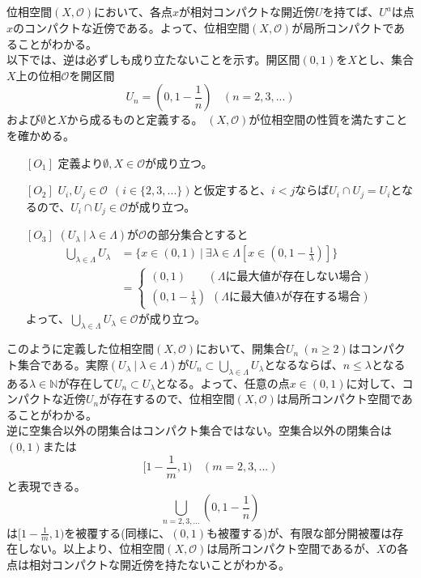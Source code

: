 \documentclass{jsarticle}
\begin{document}
\subsection{}
位相空間$(X,\mathcal{O})$において、各点$x$が相対コンパクトな開近傍$U$を持てば、$U^a$は点$x$のコンパクトな近傍である。よって、位相空間$(X,\mathcal{O})$が局所コンパクトであることがわかる。\\
以下では、逆は必ずしも成り立たないことを示す。開区間$(0,1)$を$X$とし、集合$X$上の位相$\mathcal{O}$を開区間
\[U_n=(0,1-\frac{1}{n})\ \ \ \ (n=2,3,...)\]
および$\emptyset$と$X$から成るものと定義する。
$(X,\mathcal{O})$が位相空間の性質を満たすことを確かめる。
\begin{enumerate}
\item[${[O_1]}$]
定義より$\emptyset,X\in\mathcal{O}$が成り立つ。
\item[${[O_2]}$]
$U_i,U_j\in\mathcal{O}\ \ (i\in\{2,3,...\})$と仮定すると、$i<j$ならば$U_i\cap U_j=U_i$となるので、$U_i\cap U_j\in\mathcal{O}$が成り立つ。
\item[${[O_3]}$]$(U_\lambda\ |\ \lambda\in\Lambda)$が$\mathcal{O}$の部分集合とすると
\begin{align*}
\bigcup_{\lambda\in\Lambda}U_\lambda&=\{x\in(0,1)\ |\ \exists\lambda\in\Lambda[x\in(0,1-\frac{1}{\lambda})]\}\\
&=\begin{cases}
(0,1)\ \quad\ \ \ (\Lambda に最大値が存在しない場合)\\
(0,1-\frac{1}{\lambda})\ \ (\Lambda に最大値\lambda が存在する場合)
\end{cases}
\end{align*}
よって、$\bigcup_{\lambda\in\Lambda}U_\lambda\in\mathcal{O}$が成り立つ。
\end{enumerate}
このように定義した位相空間$(X,\mathcal{O})$において、開集合$U_n\ (n\geq 2)$はコンパクト集合である。実際$(U_\lambda\ |\ \lambda\in\Lambda)$が$U_n\subset\bigcup_{\lambda\in\Lambda}U_\lambda$となるならば、$n\leq\lambda$となるある$\lambda\in\mathbb{N}$が存在して$U_n\subset U_\lambda$となる。よって、任意の点$x\in(0,1)$に対して、コンパクトな近傍$U_n$が存在するので、位相空間$(X,\mathcal{O})$は局所コンパクト空間であることがわかる。\\
逆に空集合以外の閉集合はコンパクト集合ではない。空集合以外の閉集合は$(0,1)$または
\[[1-\frac{1}{m},1)\ \ \ \ (m=2,3,...)\]
と表現できる。
\[\bigcup_{n=2,3,...}(0,1-\frac{1}{n})\]
は$[1-\frac{1}{m},1)$を被覆する(同様に、$(0,1)$も被覆する)が、有限な部分開被覆は存在しない。以上より、位相空間$(X,\mathcal{O})$は局所コンパクト空間であるが、$X$の各点は相対コンパクトな開近傍を持たないことがわかる。
\end{document}
